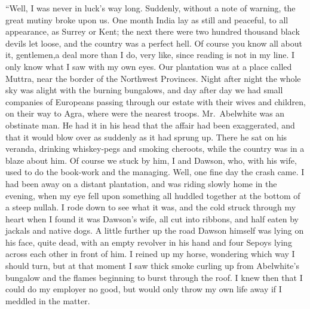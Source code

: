 \documentclass[12pt,english,oneside]{book}
\begin{document}
{}``Well, I was never in luck's way long. Suddenly, without a note
of warning, the great mutiny broke upon us. One month India lay as
still and peaceful, to all appearance, as Surrey or Kent; the next
there were two hundred thousand black devils let loose, and the country
was a perfect hell. Of course you know all about it, gentlemen,\mdsh{---}a
deal more than I do, very like, since reading is not in my line. I
only know what I saw with my own eyes. Our plantation was at a place
called Muttra, near the border of the Northwest Provinces. Night after
night the whole sky was alight with the burning bungalows, and day
after day we had small companies of Europeans passing through our
estate with their wives and children, on their way to Agra, where
were the nearest troops. Mr.\ Abelwhite was an obstinate man. He
had it in his head that the affair had been exaggerated, and that
it would blow over as suddenly as it had sprung up. There he sat on
his veranda, drinking whiskey-pegs and smoking cheroots, while the
country was in a blaze about him. Of course we stuck by him, I and
Dawson, who, with his wife, used to do the book-work and the managing.
Well, one fine day the crash came. I had been away on a distant plantation,
and was riding slowly home in the evening, when my eye fell upon something
all huddled together at the bottom of a steep nullah. I rode down
to see what it was, and the cold struck through my heart when I found
it was Dawson's wife, all cut into ribbons, and half eaten by jackals
and native dogs. A little further up the road Dawson himself was lying
on his face, quite dead, with an empty revolver in his hand and four
Sepoys lying across each other in front of him. I reined up my horse,
wondering which way I should turn, but at that moment I saw thick
smoke curling up from Abelwhite's bungalow and the flames beginning
to burst through the roof. I knew then that I could do my employer
no good, but would only throw my own life away if I meddled in the
matter. %
\end{document}
